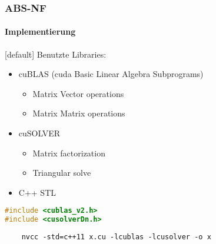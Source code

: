 \begin{frame}[fragile]
	\frametitle{ABS-NF}
	\framesubtitle{Implementierung}
	[default]
	Benutzte Libraries:
	\begin{itemize}
		\item cuBLAS (cuda Basic Linear Algebra Subprograms)
		\begin{itemize}
			\item Matrix Vector operations
			\item Matrix Matrix operations
		\end{itemize}
		\item cuSOLVER
		\begin{itemize}
			\item Matrix factorization
			\item Triangular solve
		\end{itemize}
		\item C++ STL
	\end{itemize}
\begin{lstlisting}[language=C++]
#include <cublas_v2.h>
#include <cusolverDn.h>
\end{lstlisting}

\begin{lstlisting}
	nvcc -std=c++11 x.cu -lcublas -lcusolver -o x
\end{lstlisting}
	
\end{frame}
